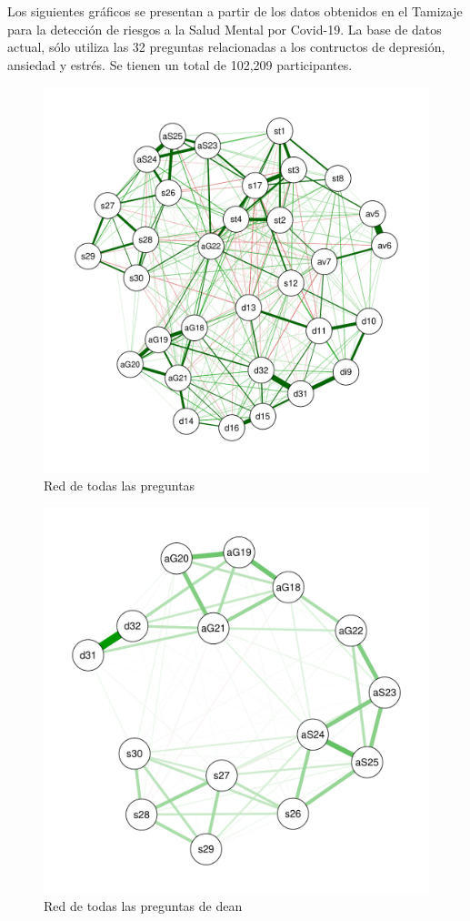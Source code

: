 \documentclass[11pt,spanish]{article}\usepackage[]{graphicx}\usepackage[]{color}
\begin{document}
Los siguientes gráficos se presentan a partir de los datos obtenidos en el Tamizaje para la detección de riesgos a la Salud Mental por Covid-19. La base de datos actual, sólo utiliza las 32 preguntas relacionadas a los contructos de depresión, ansiedad y estrés. Se tienen un total de 102,209 participantes.

\begin{figure}[ht]
\centering
\includegraphics[scale=0.7]{images/net_todo.pdf}
\caption{Red de todas las preguntas}
\label{fig:red_todas}
\end{figure}


\begin{figure}[ht]
\centering
\includegraphics[scale=0.7]{images/net_dean.pdf}
\caption{Red de todas las preguntas de dean}
\label{fig:red_dean}
\end{figure}
\end{document}

